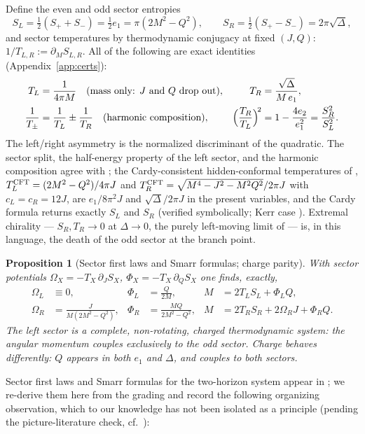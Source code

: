 \documentclass[11pt]{article}
\newtheorem{proposition}[theorem]{Proposition}
\theoremstyle{definition}
\theoremstyle{remark}
\newcommand{\disc}{\Delta}
\begin{document}
Define the even and odd sector entropies
\begin{equation}
S_L=\tfrac12(S_++S_-)=\tfrac12 e_1=\pi(2M^2-Q^2),
\qquad
S_R=\tfrac12(S_+-S_-)=2\pi\sqrt{\disc},
\end{equation}
and sector temperatures by thermodynamic conjugacy at fixed $(J,Q)$:
$1/T_{L,R}:=\partial_M S_{L,R}$. All of the following are exact identities
(Appendix~\ref{app:certs}):
\begin{align}
T_L &= \frac{1}{4\pi M} \quad\text{(mass only: $J$ and $Q$ drop out)},&
T_R &= \frac{\sqrt{\disc}}{M\,e_1},\\
\frac{1}{T_\pm} &= \frac{1}{T_L}\pm\frac{1}{T_R}
\quad\text{(harmonic composition)},&
\Bigl(\frac{T_R}{T_L}\Bigr)^{\!2} &= 1-\frac{4e_2}{e_1^2}
= \frac{S_R^2}{S_L^2}.
\end{align}
The left/right asymmetry is the normalized discriminant of the quadratic. The
sector split, the half-energy property of the left sector, and the harmonic
composition agree with \cite{CGLP2018,CL1}; the Cardy-consistent
hidden-conformal temperatures of \cite{WangLiu},
$T_L^{\rm CFT}=(2M^2-Q^2)/4\pi J$ and
$T_R^{\rm CFT}=\sqrt{M^4-J^2-M^2Q^2}/2\pi J$ with $c_L=c_R=12J$, are
$e_1/8\pi^2 J$ and $\sqrt{\disc}/2\pi J$ in the present variables, and the
Cardy formula returns exactly $S_L$ and $S_R$ (verified symbolically; Kerr
case \cite{CMS}). Extremal chirality --- $S_R,T_R\to 0$ at $\disc\to0$, the
purely left-moving limit of \cite{GHSS} --- is, in this language, the death of
the odd sector at the branch point.

\begin{proposition}[Sector first laws and Smarr formulas; charge parity]
\label{prop:sectors}
With sector potentials $\Omega_X=-T_X\,\partial_J S_X$,
$\Phi_X=-T_X\,\partial_Q S_X$ one finds, exactly,
\begin{align}
\Omega_L &\equiv 0, &
\Phi_L &= \frac{Q}{2M}, &
M &= 2T_LS_L+\Phi_L Q,\\
\Omega_R &= \frac{J}{M(2M^2-Q^2)}, &
\Phi_R &= \frac{MQ}{2M^2-Q^2}, &
M &= 2T_RS_R+2\Omega_R J+\Phi_R Q .
\end{align}
The left sector is a complete, \emph{non-rotating}, charged thermodynamic
system: the angular momentum couples exclusively to the odd sector. Charge
behaves differently: $Q$ appears in both $e_1$ and $\disc$, and couples to
both sectors.
\end{proposition}

Sector first laws and Smarr formulas for the two-horizon system appear in
\cite{CGLP2018}; we re-derive them here from the grading and record the
following organizing observation, which to our knowledge has not been isolated
as a principle (pending the picture-literature check, cf.\ \cite{Twofold}):
\end{document}
